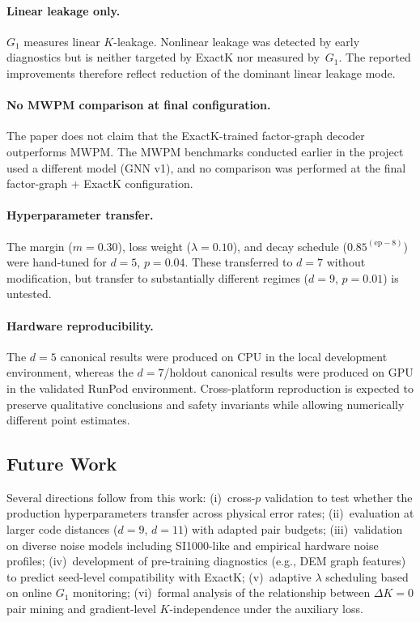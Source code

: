 \paragraph{Linear leakage only.} $G_1$ measures linear $K$-leakage. Nonlinear leakage was detected by early diagnostics but is neither targeted by ExactK nor measured by~$G_1$. The reported improvements therefore reflect reduction of the dominant linear leakage mode.

\paragraph{No MWPM comparison at final configuration.} The paper does not claim that the ExactK-trained factor-graph decoder outperforms MWPM\@. The MWPM benchmarks conducted earlier in the project used a different model (GNN v1), and no comparison was performed at the final factor-graph + ExactK configuration.

\paragraph{Hyperparameter transfer.} The margin ($m{=}0.30$), loss weight ($\lambda{=}0.10$), and decay schedule ($0.85^{(\text{ep}-8)}$) were hand-tuned for $d{=}5$, $p{=}0.04$. These transferred to $d{=}7$ without modification, but transfer to substantially different regimes ($d{=}9$, $p{=}0.01$) is untested.

\paragraph{Hardware reproducibility.} The $d{=}5$ canonical results were produced on CPU in the local development environment, whereas the $d{=}7$/holdout canonical results were produced on GPU in the validated RunPod environment. Cross-platform reproduction is expected to preserve qualitative conclusions and safety invariants while allowing numerically different point estimates.

\subsection{Future Work}

Several directions follow from this work: (i)~cross-$p$ validation to test whether the production hyperparameters transfer across physical error rates; (ii)~evaluation at larger code distances ($d{=}9$, $d{=}11$) with adapted pair budgets; (iii)~validation on diverse noise models including SI1000-like and empirical hardware noise profiles; (iv)~development of pre-training diagnostics (e.g., DEM graph features) to predict seed-level compatibility with ExactK; (v)~adaptive $\lambda$ scheduling based on online $G_1$ monitoring; (vi)~formal analysis of the relationship between $\Delta K{=}0$ pair mining and gradient-level $K$-independence under the auxiliary loss.
